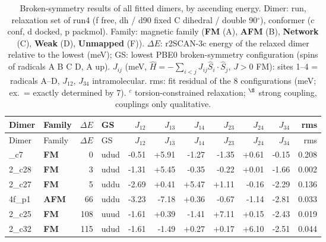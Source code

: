 {\footnotesize
\setlength{\LTleft}{0pt}\setlength{\LTright}{0pt}
\begin{longtable}{@{\extracolsep{\fill}}llrlrrrrrrr@{}}
\caption{Broken-symmetry results of all fitted dimers, by ascending energy. Dimer: run, relaxation set of
  run4 (f free, dh / d90 fixed C dihedral / double 90$^\circ$), conformer (c conf, d docked, p packmol).
  Family: magnetic family (\textcolor{famFM}{\textbf{FM}} (A), \textcolor{famAFM}{\textbf{AFM}} (B), \textcolor{famNetwork}{\textbf{Network}} (C), \textcolor{famWeak}{\textbf{Weak}} (D), \textcolor{famUnmapped}{\textbf{Unmapped}} (F)). $\Delta E$: r2SCAN-3c energy of the relaxed dimer relative to
  the lowest (meV); GS: lowest PBE0 broken-symmetry configuration (spins of radicals A B C D, A up).
  $J_{ij}$ (meV, $\hat H=-\sum_{i<j}J_{ij}\hat S_i\cdot\hat S_j$, $J>0$ FM): sites 1--4 = radicals A--D,
  $J_{12}$, $J_{34}$ intramolecular. rms: fit residual of the 8 configurations (meV; ex.\ = exactly
  determined by 7). $^{c}$ torsion-constrained relaxation;
  $^{\S}$ strong coupling, couplings only qualitative.}\label{tab:bs_summary_all_runs}\\
\toprule
Dimer & Family & $\Delta E$ & GS & $J_{12}$ & $J_{13}$ & $J_{14}$ & $J_{23}$ & $J_{24}$ & $J_{34}$ & rms \\
\midrule
\endfirsthead
\toprule
Dimer & Family & $\Delta E$ & GS & $J_{12}$ & $J_{13}$ & $J_{14}$ & $J_{23}$ & $J_{24}$ & $J_{34}$ & rms \\
\midrule
\endhead
\bottomrule
\endlastfoot
2\_c7 & \textcolor{famFM}{\textbf{FM}} & 0 & udud & -0.51 & +5.91 & -1.27 & -1.35 & +0.61 & -0.15 & 0.208 \\
2\_c28 & \textcolor{famFM}{\textbf{FM}} & 3 & udud & -1.31 & +5.45 & -0.35 & -0.22 & +0.01 & -1.66 & 0.002 \\
2\_c27 & \textcolor{famFM}{\textbf{FM}} & 5 & uddu & -2.69 & +0.41 & +5.47 & +1.11 & -0.16 & -2.29 & 0.136 \\
4f\_p1 & \textcolor{famAFM}{\textbf{AFM}} & 66 & uddu & -3.23 & -7.18 & +0.36 & -0.67 & -1.14 & -2.81 & 0.033 \\
2\_c25 & \textcolor{famFM}{\textbf{FM}} & 108 & uuud & -1.61 & +0.39 & -1.41 & +7.11 & +0.15 & -2.43 & 0.019 \\
2\_c32 & \textcolor{famFM}{\textbf{FM}} & 115 & udud & -1.61 & -1.49 & +0.27 & +0.17 & +6.10 & -2.51 & 0.044 \\

\end{longtable}}
